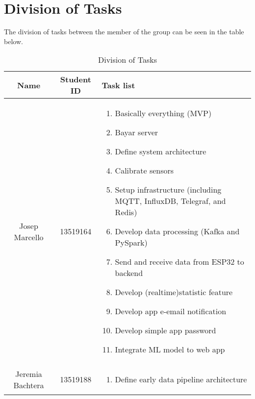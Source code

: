 \section*{Division of Tasks}

The division of tasks between the member of the group can be seen in the table
below.

\begin{table}[htbp]
	\caption{Division of Tasks}
	\begin{center}
		\begin{tabular}{|c|c|p{3cm}|}
			\hline
			\textbf{Name}    & \textbf{Student ID} & \textbf{Task list}                                                        \\
			\hline
			Josep Marcello   & 13519164            & \begin{enumerate}[leftmargin=*]
				                                         \item Basically everything (MVP)
				                                         \item Bayar server
				                                         \item Define system architecture
				                                         \item Calibrate sensors
				                                         \item Setup infrastructure (including MQTT, InfluxDB, Telegraf, and Redis)
				                                         \item Develop data processing (Kafka and PySpark)
				                                         \item Send and receive data from ESP32 to backend
				                                         \item Develop (realtime)statistic feature
				                                         \item Develop app e-email notification
				                                         \item Develop simple app password
				                                         \item Integrate ML model to web app
			                                         \end{enumerate}
			\\
			\hline
			Jeremia Bachtera & 13519188            & \begin{enumerate}[leftmargin=*]
				                                         \item Define early data pipeline architecture

\end{enumerate}
\end{tabular}
\end{center}
\end{table}
